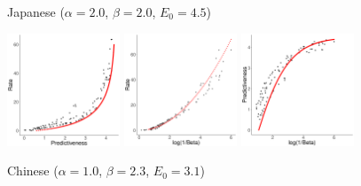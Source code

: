 \documentclass[11pt,letterpaper]{article}
\begin{document}
\begin{figure}
	\begin{center}
		Japanese {\tiny ($\alpha=2.0$, $\beta=2.0$, $E_0=4.5$)}


\includegraphics[width=0.3\textwidth]{code/figures/LDC95T8-words-info-fitted.pdf}
\includegraphics[width=0.3\textwidth]{code/figures/LDC95T8-words-nlogbeta-mem-fitted.pdf}
\includegraphics[width=0.3\textwidth]{code/figures/LDC95T8-words-nlogbeta-ee-fitted.pdf}

		Chinese {\tiny ($\alpha=1.0$, $\beta=2.3$, $E_0=3.1$)}



\end{center}
\end{figure}
\end{document}
